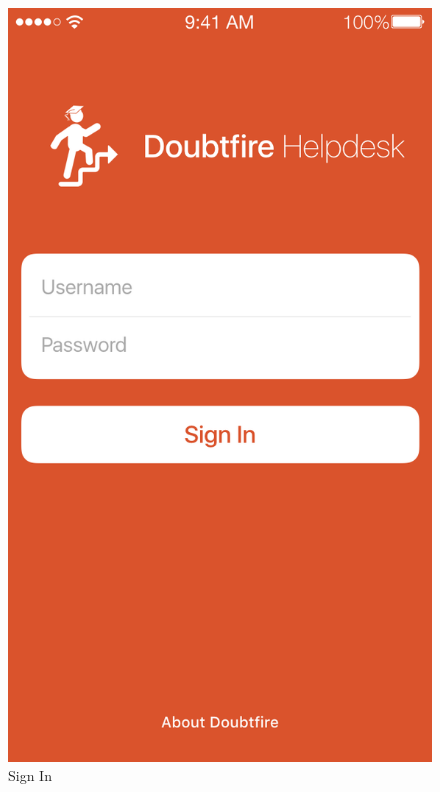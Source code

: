 \documentclass[a4paper,12pt]{article}
\begin{document}
\begin{figure}[p]
\centering
\includegraphics[scale=0.5]{5b7845cea9.png}
\caption{Sign In}
\label{12}
\end{figure}
\end{document}
